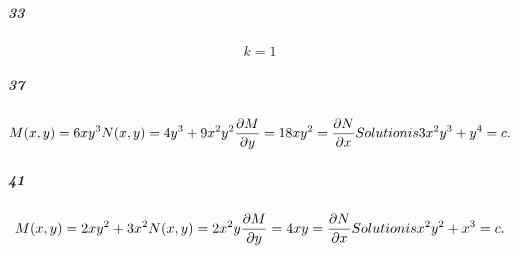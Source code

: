 \documentclass[fleqn]{article}
\begin{document}
\subparagraph{33}

\[
k = 1
\]
\vfill



\subparagraph{37}

\[
M(x, y) = 6xy^3 \\ N(x, y) = 4y^3 + 9x^2y^2 \\ \frac{\partial M}{\partial y} = 18xy^2 = \frac{\partial N}{\partial x} \\ Solution is 3x^2y^3 + y^4 = c.
\]
\vfill



\subparagraph{41}

\[
M(x, y) = 2xy^2 + 3x^2 \\ N(x, y) = 2x^2y \\ \frac{\partial M}{\partial y} = 4xy = \frac{\partial N}{\partial x} \\ Solution is x^2y^2 + x^3 = c.
\]
\vfill
\end{document}
